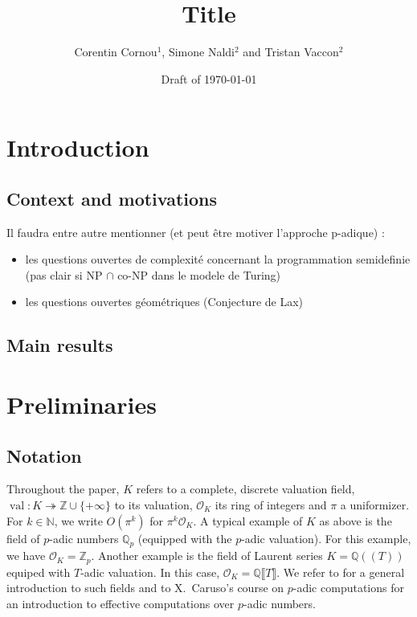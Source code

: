 \documentclass[a4paper,12pt]{article}
\title{\bf Title}
\newcommand{\N}{\mathbb{N}} %
\DeclareMathOperator{\val}{val}
\def\QQ{\ensuremath{\mathbb{Q}}}
\def\ZZ{\ensuremath{\mathbb{Z}}}
\newcommand{\OK}{\mathcal{O}_K}
\begin{document}
\author{Corentin Cornou$^{1}$, Simone Naldi$^2$ and Tristan Vaccon$^2$}


\date{Draft of \today}

\maketitle

\begin{abstract}
\end{abstract}


\tableofcontents


\section{Introduction}

\subsection{Context and motivations}

Il faudra entre autre mentionner (et peut être motiver l'approche p-adique) :
\begin{itemize}
\item les questions ouvertes de complexité concernant la programmation semidefinie (pas clair si NP $\cap$ co-NP
  dans le modele de Turing)
\item les questions ouvertes géométriques (Conjecture de Lax)
\end{itemize}


\subsection{Main results}



\section{Preliminaries}

\subsection{Notation}

Throughout the paper, $K$ refers to a complete,
discrete valuation field, $\val : K \twoheadrightarrow \ZZ \cup \{+\infty\}$ to its valuation,
$\OK$ its ring of integers and $\pi$ a uniformizer.
For $k \in \N$, we write $O(\pi^k)$ for $\pi^k \OK.$
A typical example of $K$ as above is the field of $p$-adic numbers 
$\QQ_p$ (equipped with the $p$-adic valuation). For this example, we 
have $\OK = \ZZ_p$.
Another example is the field of Laurent series
$K=\QQ(\!(T)\!)$ equiped with $T$-adic valuation.
In this case,  $\OK = \QQ \llbracket T \rrbracket$.
We refer to \cite{Serre:1979} for a
general introduction to such fields
and to X.~Caruso's course on $p$-adic computations \cite{caruso_computations_2017}
for an introduction to effective computations over $p$-adic numbers.
\end{document}

